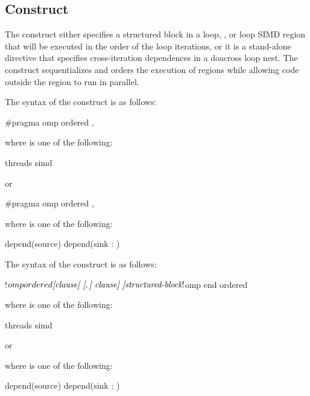 \subsection{ Construct}
\label{subsec:ordered Construct}
\summary
The  construct either specifies a structured block in a loop,
, or loop SIMD region that will be executed in the order of the
loop iterations, or it is a stand-alone directive that specifies
cross-iteration dependences in a doacross loop nest. The 
construct sequentializes and orders the execution of  regions
while allowing code outside the region to run in parallel.

\begin{samepage}
\syntax
\begin{ccppspecific}
The syntax of the  construct is as follows:

\begin{ompcPragma}
#pragma omp ordered \plc{[clause[ [},\plc{] clause] ]} 
\end{ompcPragma}

where  is one of the following:
\begin{indentedcodelist}
threads
simd
\end{indentedcodelist}

or

\begin{ompcPragma}
#pragma omp ordered \plc{clause [[[},\plc{] clause] ... ]} 
\end{ompcPragma}
where  is one of the following:
\begin{indentedcodelist}
depend(source)
depend(sink : )
\end{indentedcodelist}


\end{ccppspecific}
\end{samepage}

\begin{fortranspecific}
The syntax of the  construct is as follows:

\begin{ompfPragma}
!$omp ordered \plc{[clause[ [},\plc{] clause] ]}
    \plc{structured-block}
!$omp end ordered
\end{ompfPragma}

where  is one of the following:
\begin{indentedcodelist}
threads
simd
\end{indentedcodelist}

or


where  is one of the following:
\begin{indentedcodelist}
depend(source)
depend(sink : )
\end{indentedcodelist}
\end{fortranspecific}

